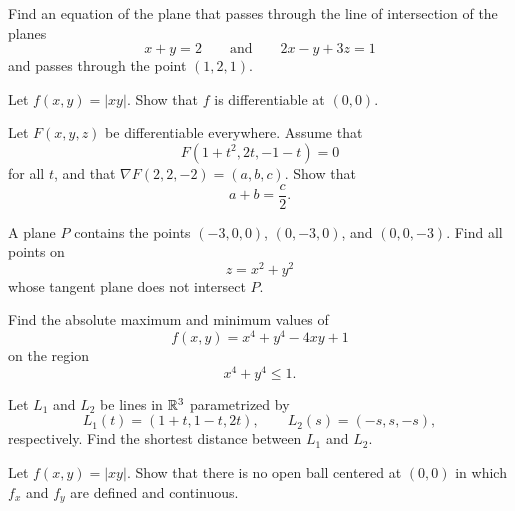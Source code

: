 
\schoolsection{\POSTECH}{\PohangUniversityOfScienceAndTechnology}

\begin{problem}
Find an equation of the plane that passes through the line of intersection of the planes
\[
x+y=2
\qquad\text{and}\qquad
2x-y+3z=1
\]
and passes through the point $(1, 2, 1)$.
\end{problem}

\begin{problem}
Let $f(x, y)=|xy|$. Show that $f$ is differentiable at $(0, 0)$.
\end{problem}

\begin{problem}
Let $F(x, y, z)$ be differentiable everywhere. Assume that
\[
F(1+t^2, 2t, -1-t)=0
\]
for all $t$, and that $\nabla F(2, 2, -2)=(a, b, c)$. Show that
\[
a+b=\frac{c}{2}.
\]
\end{problem}

\begin{problem}
A plane $P$ contains the points $(-3, 0, 0)$, $(0, -3, 0)$, and $(0, 0, -3)$. Find all points on
\[
z=x^2+y^2
\]
whose tangent plane does not intersect $P$.
\end{problem}

\begin{problem}
Find the absolute maximum and minimum values of
\[
f(x, y)=x^4+y^4-4xy+1
\]
on the region
\[
x^4+y^4\le 1.
\]
\end{problem}

\begin{problem}
Let $L_1$ and $L_2$ be lines in $\mathbb{R}^3$ parametrized by
\[
L_1(t)=(1+t, 1-t, 2t),
\qquad
L_2(s)=(-s, s, -s),
\]
respectively. Find the shortest distance between $L_1$ and $L_2$.
\end{problem}

\begin{problem}
Let $f(x, y)=|xy|$. Show that there is no open ball centered at $(0, 0)$ in which $f_x$ and $f_y$ are defined and continuous.
\end{problem}

